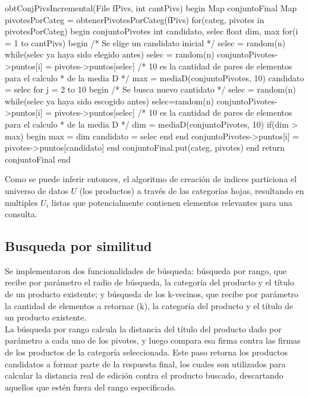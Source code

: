 \begin{algorithm}[caption={Selecci\'on de pivotes incremental}, label={alg3}]
obtConjPivsIncremental(File fPivs, int cantPivs)
begin
 Map conjuntoFinal
 Map pivotesPorCateg = obtenerPivotesPorCateg(fPivs)
 for(categ, pivotes in pivotesPorCateg)
 begin
  conjuntoPivotes
  int candidato, selec
  float dim, max
  for(i = 1 to cantPivs)
  begin
   /* Se elige un candidato inicial */ 
   selec = random(n)
   while(selec ya haya sido elegido antes)
    selec = random(n)
   conjuntoPivotes->puntos[i] = pivotes->puntos[selec]
   /* 10 es la cantidad de pares de elementos para el calculo
    * de la media D */
   max = mediaD(conjuntoPivotes, 10)
   candidato = selec
   for j = 2 to 10
    begin
    /* Se busca nuevo cantidato */
    selec = random(n)
    while(selec ya haya sido escogido antes)
     selec=random(n)
    conjuntoPivotes->puntos[i] = pivotes->puntos[selec]
    /* 10 es la cantidad de pares de elementos para el calculo 
     * de la media D */
    dim = mediaD(conjuntoPivotes, 10)
    if(dim > max)
    begin
     max = dim
     candidato = selec
    end
   end
   conjuntoPivotes->puntos[i] = pivotes->puntos[candidato]
  end
  conjuntoFinal.put(categ, pivotes)
 end
 return conjuntoFinal
end
\end{algorithm}

Como se puede inferir entonces, el algoritmo de creaci\'on de indices particiona el universo de datos $U$ (los productos) a trav\'es de las categor\'ias hojas, resultando en multiples $U_i$ listas que potencialmente contienen elementos relevantes para una consulta.\\

\subsection{Busqueda por similitud}

Se implementaron dos funcionalidades de b\'usqueda: b\'usqueda por rango, que recibe por par\'ametro el radio de b\'usqueda, la categor\'ia del producto y el t\'itulo de un producto existente; y b\'usqueda de los k-vecinos, que recibe por par\'ametro la cantidad de elementos a retornar (k), la categor\'ia del producto y el t\'itulo de un producto existente.\\

La b\'usqueda por rango calcula la distancia del t\'itulo del producto dado por par\'ametro a cada uno de los pivotes, y luego compara esa firma contra las firmas de los productos de la categor\'ia seleccionada. Este paso retorna los productos candidatos a formar parte de la respuesta final, los cuales son utilizados para calcular la distancia real de edici\'on contra el producto buscado, descartando aquellos que est\'en fuera del rango especificado.\\

